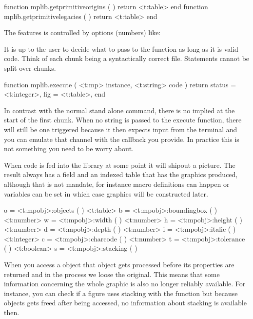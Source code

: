 \starttyping[option=LUA]
function mplib.getprimitiveorigins  ( ) return <t:table> end
function mplib.getprimitivelegacies ( ) return <t:table> end
\stoptyping

The  features is controlled by options (numbers) like:

\startfourrows
\stopfourrows

\stopsection

\startsection[title=Processing]

It is up to the user to decide what to pass to the  function as
long as it is valid code. Think of each chunk being a syntactically correct file.
Statements cannot be split over chunks.

\starttyping[option=LUA]
function mplib.execute ( <t:mp> instance, <t:string> code )
    return {
        status = <t:integer>,
        fig    = <t:table>,
    }
end
\stoptyping

In contrast with the normal stand alone  command, there is no
implied  at the start of the first chunk. When no string is passed
to the execute function, there will still be one triggered because it then
expects input from the terminal and you can emulate that channel with the
callback you provide. In practice this is not something you need to be worry
about.

When code is fed into the library at some point it will shipout a picture. The
result always has a  field and an indexed  table that
has the graphics produced, although that is not mandate, for instance macro
definitions can happen or variables can be set in which case graphics will be
constructed later.

 o = <t:mpobj>:objects     ( )
<t:table>    b = <t:mpobj>:boundingbox ( )
<t:number>   w = <t:mpobj>:width       ( )
<t:number>   h = <t:mpobj>:height      ( )
<t:number>   d = <t:mpobj>:depth       ( )
<t:number>   i = <t:mpobj>:italic      ( )
<t:integer>  c = <t:mpobj>:charcode    ( )
<t:number>   t = <t:mpobj>:tolerance   ( )
<t:boolean>  s = <t:mpobj>:stacking    ( )
\stoptyping

When you access a object that object gets processed before its properties are
returned and in the process we loose the original. This means that some
information concerning the whole graphic is also no longer reliably available.
For instance, you can check if a figure uses stacking with the 
function but because objects gets freed after being accessed, no information
about stacking is available then.

